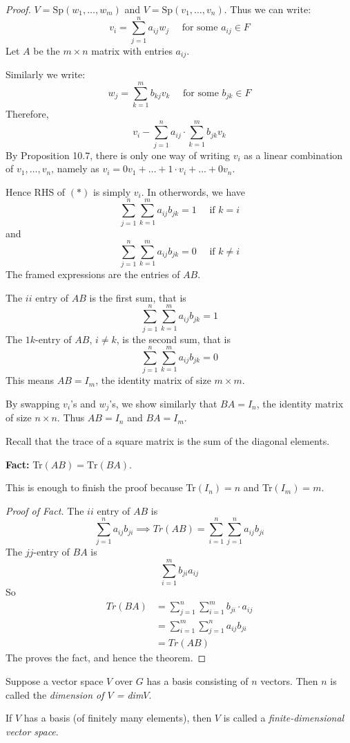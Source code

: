 \documentclass[10pt]{scrartcl}
\begin{document}
 \begin{proof}
 $V = \mathrm{Sp}(w_1,\dots,w_m)$ and $V = \mathrm{Sp}(v_1,\dots,v_n)$. Thus we can write: 
 \[
  v_i = \sum_{j=1}^n a_{ij}w_j \quad \text{ for some } a_{ij} \in F
\]
Let $A$ be the $m \times n$ matrix with entries $a_{ij}$. 

Similarly we write: 
\[
  w_j = \sum_{k=1}^m b_{kj}v_k \quad \text{ for some } b_{jk} \in F
\]
Therefore, 
\[
  v_i - \sum_{j=1}^n a_{ij} \cdot \sum_{k=1}^m b_{jk} v_k \tag{$*$}
\]
By Proposition 10.7, there is only one way of writing $v_i$ as a linear combination of $v_1,\dots,v_n$, namely as $v_i = 0v_1 + \dots + 1\cdot v_i + \dots + 0v_n$. 

Hence RHS of $(*)$ is simply $v_i$. In otherwords, we have 
\[
  \sum_{j=1}^n \sum_{k=1}^m a_{ij}b_{jk} = 1 \quad \text{ if } k =i
\]
and 
\[
  \sum_{j=1}^n \sum_{k=1}^m a_{ij}b_{jk} = 0 \quad \text{ if } k \neq i
\]
The framed expressions are the entries of $AB$. 

The $ii$ entry of $AB$ is the first sum, that is 
\[
  \sum_{j=1}^n \sum_{k=1}^m a_{ij}b_{jk} = 1
\]
The $1k$-entry of $AB$, $i \neq k$, is the second sum, that is 
\[
  \sum_{j=1}^n\sum_{k=1}^m a_{ij}b_{jk} = 0
\]
This means $AB = I_m$, the identity matrix of size $m \times m$. 

By swapping $v_i$'s and $w_j$'s, we show similarly that $BA = I_n$, the identity matrix of size $n \times n$. Thus $AB = I_n$ and $BA = I_m$. 

Recall that the trace of a square matrix is the sum of the diagonal elements. 

\textbf{Fact:} Tr$(AB) = \mathrm{Tr}(BA)$. 

This is enough to finish the proof because Tr$(I_n) = n$ and Tr$(I_m) = m$. 

\emph{Proof of Fact.} The $ii$ entry of $AB$ is 
\[
  \sum_{j=1}^n a_{ij}b_{ji} \implies Tr(AB) = \sum_{i=1}^n \sum_{j=1}^n a_{ij}b_{ji}
\]
The $jj$-entry of $BA$ is 
\[
  \sum_{i=1}^m b_{ji}a_{ij}
\]
So
\begin{align*}
  Tr(BA) &= \sum_{j=1}^n \sum_{i=1}^m b_{ji} \cdot a_{ij}\\
  &= \sum_{i=1}^m \sum_{j=1}^n a_{ij}b_{ji} \\
  &= Tr(AB)
\end{align*}
The proves the fact, and hence the theorem. 
\end{proof}

\begin{definition}
	Suppose a vector space $V$ over $G$ has a basis consisting of $n$ vectors. Then $n$ is called the \emph{dimension of $V$ = dim$V$}. 
	
	If $V$ has a basis (of finitely many elements), then $V$ is called a \emph{finite-dimensional vector space}.
\end{definition}\vsp
\end{document}
